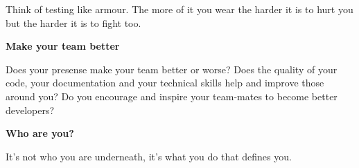 Think of testing like armour. 
The more of it you wear the harder it is to hurt you but the harder it is to fight too.

{\bf Make your team better}
\par
Does your presense make your team better or worse? 
Does the quality of your code, your documentation and your technical skills help and improve those around you?
Do you encourage and inspire your team-mates to become better developers?

{\bf Who are you?} \par
It's not who you are underneath, it's what you do that defines you.

